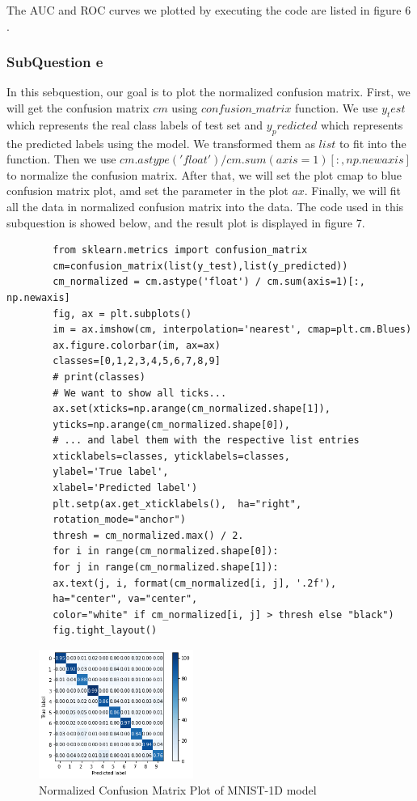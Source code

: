 \documentclass[conference]{IEEEtran}
\begin{document}
	The AUC and ROC curves we plotted by executing the code are listed in figure $6$.
	
	
	\subsubsection{SubQuestion e}
	In this sebquestion, our goal is to plot the normalized confusion matrix.
    First, we will get the confusion matrix $cm$ using $confusion\_matrix$ function.
    We use $y_test$ which represents the real class labels of test set and $y_predicted$ which represents the predicted labels using the model.
    We transformed them as $list$ to fit into the function.
    Then we use $cm.astype('float') / cm.sum(axis=1)[:, np.newaxis]$ to normalize the confusion matrix.
    After that, we will set the plot cmap to blue confusion matrix plot, amd set the parameter in the plot $ax$.
    Finally, we will fit all the data in normalized confusion matrix into the data.
	The code used in this subquestion is showed below, and the result plot is displayed in figure 7.
	\begin{lstlisting}
		from sklearn.metrics import confusion_matrix
		cm=confusion_matrix(list(y_test),list(y_predicted))
		cm_normalized = cm.astype('float') / cm.sum(axis=1)[:, np.newaxis]
		fig, ax = plt.subplots()
		im = ax.imshow(cm, interpolation='nearest', cmap=plt.cm.Blues)
		ax.figure.colorbar(im, ax=ax)
		classes=[0,1,2,3,4,5,6,7,8,9]
		# print(classes)
		# We want to show all ticks...
		ax.set(xticks=np.arange(cm_normalized.shape[1]),
		yticks=np.arange(cm_normalized.shape[0]),
		# ... and label them with the respective list entries
		xticklabels=classes, yticklabels=classes,
		ylabel='True label',
		xlabel='Predicted label')
		plt.setp(ax.get_xticklabels(),  ha="right",
		rotation_mode="anchor")
		thresh = cm_normalized.max() / 2.
		for i in range(cm_normalized.shape[0]):
		for j in range(cm_normalized.shape[1]):
		ax.text(j, i, format(cm_normalized[i, j], '.2f'),
		ha="center", va="center",
		color="white" if cm_normalized[i, j] > thresh else "black")
		fig.tight_layout()
	\end{lstlisting}
	
	\begin{figure}[h] 
		\centering
		\includegraphics[width=0.45\textwidth]{./graphs/T1Q3e.png}
		\caption{Normalized Confusion Matrix Plot of MNIST-1D model}
		\label{Fig.t1q3e}
	\end{figure}
\end{document}
